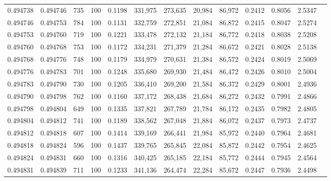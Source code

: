 \begin{tabular}{rrrrrrrrrrrrr}
0.494738 & 0.494746 &   735 & 100 &                                     0.1198 & 331,975 & 273,635 &  20,984 &  86,972 & 0.2412 & 0.8056 & 2.5347 \\
0.494746 & 0.494753 &   784 & 100 &                                     0.1131 & 332,759 & 272,851 &  21,084 &  86,872 & 0.2415 & 0.8047 & 2.5274 \\
0.494753 & 0.494760 &   719 & 100 &                                     0.1221 & 333,478 & 272,132 &  21,184 &  86,772 & 0.2418 & 0.8038 & 2.5208 \\
0.494760 & 0.494768 &   753 & 100 &                                     0.1172 & 334,231 & 271,379 &  21,284 &  86,672 & 0.2421 & 0.8028 & 2.5138 \\
0.494768 & 0.494776 &   748 & 100 &                                     0.1179 & 334,979 & 270,631 &  21,384 &  86,572 & 0.2424 & 0.8019 & 2.5069 \\
0.494776 & 0.494783 &   701 & 100 &                                     0.1248 & 335,680 & 269,930 &  21,484 &  86,472 & 0.2426 & 0.8010 & 2.5004 \\
0.494783 & 0.494790 &   730 & 100 &                                     0.1205 & 336,410 & 269,200 &  21,584 &  86,372 & 0.2429 & 0.8001 & 2.4936 \\
0.494790 & 0.494798 &   762 & 100 &                                     0.1160 & 337,172 & 268,438 &  21,684 &  86,272 & 0.2432 & 0.7991 & 2.4866 \\
0.494798 & 0.494804 &   649 & 100 &                                     0.1335 & 337,821 & 267,789 &  21,784 &  86,172 & 0.2435 & 0.7982 & 2.4805 \\
0.494804 & 0.494812 &   741 & 100 &                                     0.1189 & 338,562 & 267,048 &  21,884 &  86,072 & 0.2437 & 0.7973 & 2.4737 \\
0.494812 & 0.494818 &   607 & 100 &                                     0.1414 & 339,169 & 266,441 &  21,984 &  85,972 & 0.2440 & 0.7964 & 2.4681 \\
0.494818 & 0.494824 &   596 & 100 &                                     0.1437 & 339,765 & 265,845 &  22,084 &  85,872 & 0.2442 & 0.7954 & 2.4625 \\
0.494824 & 0.494831 &   660 & 100 &                                     0.1316 & 340,425 & 265,185 &  22,184 &  85,772 & 0.2444 & 0.7945 & 2.4564 \\
0.494831 & 0.494839 &   711 & 100 &                                     0.1233 & 341,136 & 264,474 &  22,284 &  85,672 & 0.2447 & 0.7936 & 2.4498 \\

\end{tabular}
